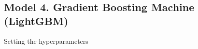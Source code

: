 \documentclass[11pt]{article}
\begin{document}
    \begin{center}
    \end{center}
    { \hspace*{\fill} \\}
    
    \begin{center}
    \end{center}
    { \hspace*{\fill} \\}
    
    \subsection{Model 4. Gradient Boosting Machine
(LightGBM)}\label{model-4.-gradient-boosting-machine-lightgbm}

Setting the hyperparameters
\end{document}

